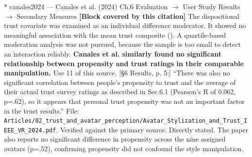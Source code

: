\documentclass[11pt, a4paper]{article}
\makeatletter
\newcounter{citentry}
\newcommand{\citentry@core}[7]{%
  \stepcounter{citentry}
  \begingroup
  \sbox{\citentry@measurebox}{%
    \begin{minipage}{\linewidth}
      \noindent\colorbox{konstanzblue}{\parbox{\dimexpr\linewidth-2\fboxsep}{%
        \vspace{3pt}
        \textbf{\#\thecitentry \quad #2} \hfill \textit{#3}
        \vspace{3pt}
      }}
      \vspace{3pt}
      \noindent\begin{tabular}{@{}p{2.7cm} p{\dimexpr\linewidth-3cm}@{}}
        \textit{\small Sentence in thesis:} & #4 \\[5pt]
        \textbf{Usage:}\hfill       & #5 \\[5pt]
        \textit{\small Original source:}     & #6 \\[5pt]
        \textbf{How to check:}             & #7 \\
      \end{tabular}
      \vspace{5pt}
      \rule{10pt}{10pt}\quad \textbf{Validated} --- I have read the original and agree it supports the sentence.
    \end{minipage}%
  }%
  \Needspace{\dimexpr\ht\citentry@measurebox+\dp\citentry@measurebox\relax}%
  \endgroup
  \vspace{10pt}
  \noindent\colorbox{konstanzblue}{\parbox{\dimexpr\linewidth-2\fboxsep}{%
    \vspace{3pt}
    \textcolor{white}{\textbf{\#\thecitentry \quad #2}} \hfill \textcolor{white}{\textit{#3}}
    \vspace{3pt}
  }}
  \vspace{3pt}
  \noindent\begin{tabular}{@{}p{2.7cm} p{\dimexpr\linewidth-3cm}@{}}
    \textit{\small Sentence in thesis:} & \textcolor{darkgreen}{#4} \\[5pt]
    \textbf{Usage:}\hfill       & #5 \\[5pt]
    \textit{\small Original source:}     & \textcolor{darkred}{#6} \\[5pt]
    \textbf{How to check:}             & #7 \\
  \end{tabular}
  \vspace{5pt}
  \noindent\CheckBox[name=verified\thecitentry, width=10pt, height=10pt, bordercolor={0 0 0}, borderwidth=0.75, backgroundcolor={1 1 1}#1]{}\quad \textbf{Validated} --- I have read the original and agree it supports the sentence.
  \vspace{3pt}
  \noindent\textcolor{midgray}{\rule{\linewidth}{0.4pt}}
}
\newcommand{\citentry}{\@ifstar{\citentry@core{, checked}}{\citentry@core{}}}
\makeatother
\begin{document}
\begin{Form}
\citentry*
  {canales2024 --- Canales et al. (2024)}
  {Ch.6 Evaluation $\rightarrow$ User Study Results $\rightarrow$ Secondary Measures}
  {\textbf{[Block covered by this citation]} The dispositional trust covariate was examined as an individual difference moderator. It showed no meaningful association with the mean trust composite (). A quartile-based moderation analysis was not pursued, because the sample is too small to detect an interaction reliably. \textbf{Canales et al. similarly found no significant relationship between propensity and trust ratings in their comparable manipulation.}}
  {Use 11 of this source.}
  {[§6 Results, p. 5:] ``There was also no significant correlation between people's propensity to trust and the average of their actual trust survey ratings as described in Sec.6.1 (Pearson's R of 0.062, p=.62), so it appears that personal trust propensity was not an important factor in the trust results.''}
  {File: \texttt{\footnotesize Articles/02\_trust\_and\_avatar\_perception/Avatar\_Stylization\_and\_Trust\_IEEE\_VR\_2024.pdf}. Verified against the primary source. Directly stated. The paper also reports no significant difference in propensity across the nine assigned avatars (p=.52), confirming propensity did not confound the style manipulation.}


\end{Form}
\end{document}
